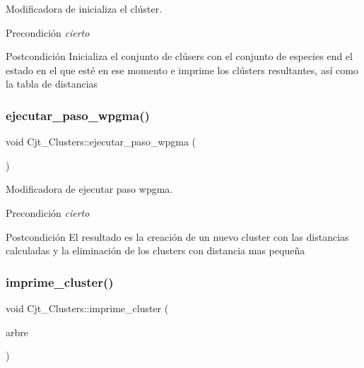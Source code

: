 Modificadora de inicializa el clúster. 

\begin{DoxyPrecond}{Precondición}
{\itshape cierto} 
\end{DoxyPrecond}
\begin{DoxyPostcond}{Postcondición}
Inicializa el conjunto de clúsers con el conjunto de especies end el estado en el que esté en ese momento e imprime los clústers resultantes, así como la tabla de distancias 
\end{DoxyPostcond}
\mbox{\label{class_cjt___clusters_a1656b81e5200625b44c8f138c09af068}} 
\subsubsection{\texorpdfstring{ejecutar\+\_\+paso\+\_\+wpgma()}{ejecutar\_paso\_wpgma()}}
{\footnotesize\ttfamily void Cjt\+\_\+\+Clusters\+::ejecutar\+\_\+paso\+\_\+wpgma (\begin{DoxyParamCaption}{ }\end{DoxyParamCaption})}



Modificadora de ejecutar paso wpgma. 

\begin{DoxyPrecond}{Precondición}
{\itshape cierto} 
\end{DoxyPrecond}
\begin{DoxyPostcond}{Postcondición}
El resultado es la creación de un nuevo cluster con las distancias calculadas y la eliminación de los clusters con distancia mas pequeña 
\end{DoxyPostcond}
\mbox{\label{class_cjt___clusters_a284f66b3e8c47eded1e24af805b81505}} 
\subsubsection{\texorpdfstring{imprime\+\_\+cluster()}{imprime\_cluster()}}
{\footnotesize\ttfamily void Cjt\+\_\+\+Clusters\+::imprime\+\_\+cluster (\begin{DoxyParamCaption}\item[{\hyperlink{class_bin_tree}{Bin\+Tree}$<$ pair$<$ string, double $>$$>$}]{arbre }\end{DoxyParamCaption})}



